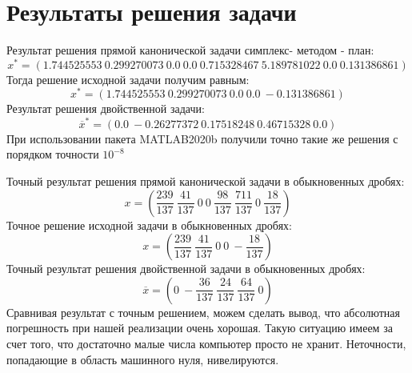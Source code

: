 \documentclass{article}
\begin{document}
\section{Результаты решения задачи}
\noindent Результат решения прямой канонической задачи симплекс- методом - план:
$$x^* = (1.744525553~0.299270073~0.0~0.0~0.715328467~5.189781022~0.0~0.131386861)$$
Тогда решение исходной задачи получим равным:
$$x^* = (1.744525553~0.299270073~0.0~0.0~-0.131386861)$$
Результат решения двойственной задачи:
$$\overline{x}^* = (0.0~-0.26277372~0.17518248~0.46715328~0.0) $$
При использовании пакета MATLAB2020b получили точно такие же решения с порядком точности $10^{-8}$

\noindent Точный результат решения прямой канонической задачи в обыкновенных дробях:
$$x = (\frac{239}{137}~\frac{41}{137}~0~0~\frac{98}{137}~\frac{711}{137}~0~\frac{18}{137}) $$
Точное решение исходной задачи в обыкновенных дробях:
$$x = (\frac{239}{137}~\frac{41}{137}~0~0~-\frac{18}{137}) $$
Точный результат решения двойственной задачи в обыкновенных дробях:
$$\overline{x} = (0~-\frac{36}{137}~\frac{24}{137}~\frac{64}{137}~0) $$
Сравнивая результат с точным решением, можем сделать вывод, что абсолютная погрешность при нашей реализации очень хорошая. Такую ситуацию имеем за счет того, что достаточно малые числа компьютер просто не хранит. Неточности, попадающие в область машинного нуля, нивелируются.
\end{document}
